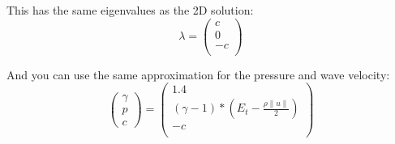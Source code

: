 \documentclass[12pt,letterpaper]{article}
\begin{document}
This has the same eigenvalues as the 2D solution:
\begin{equation*}
    \lambda = \left( \begin{array}{lr}
                     c \\
                     0 \\
                    -c \\
        \end{array} \right)
\end{equation*}

And you can use the same approximation for the pressure and wave velocity:
\begin{equation*}
    \left( \begin{array}{lr}
            \gamma \\ 
            p \\ 
            c \end{array} \right) =
    \left( \begin{array}{lr}
                     1.4 \\
                     (\gamma - 1) * ( E_t - \frac{\rho \|u\|}{2} ) \\
                    -c \\
        \end{array} \right)
\end{equation*}
\end{document}
